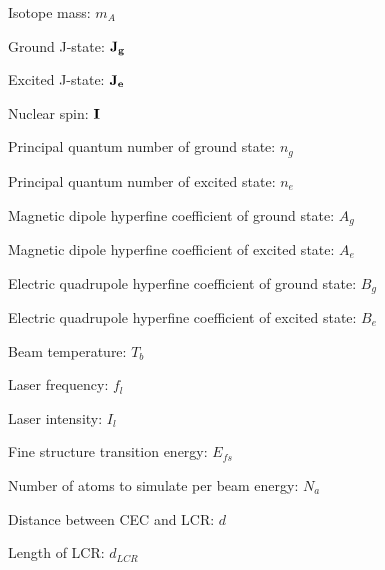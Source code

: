 \begin{list}{•}{List of Preliminary Parameters and Their Symbols}
\item Isotope mass: $m_A$
\item Ground J-state: $\bf{J}_g$
\item Excited J-state: $\bf{J}_e$
\item Nuclear spin: $\bf{I}$
\item Principal quantum number of ground state: $n_g$
\item Principal quantum number of excited state: $n_e$
\item Magnetic dipole hyperfine coefficient of ground state: $A_g$
\item Magnetic dipole hyperfine coefficient of excited state: $A_e$
\item Electric quadrupole hyperfine coefficient of ground state: $B_g$
\item Electric quadrupole hyperfine coefficient of excited state: $B_e$
\item Beam temperature: $T_b$
\item Laser frequency: $f_l$
\item Laser intensity: $I_l$
\item Fine structure transition energy: $E_{fs}$
\item Number of atoms to simulate per beam energy: $N_a$
\item Distance between CEC and LCR: $d$
\item Length of LCR: $d_{LCR}$
\end{list}